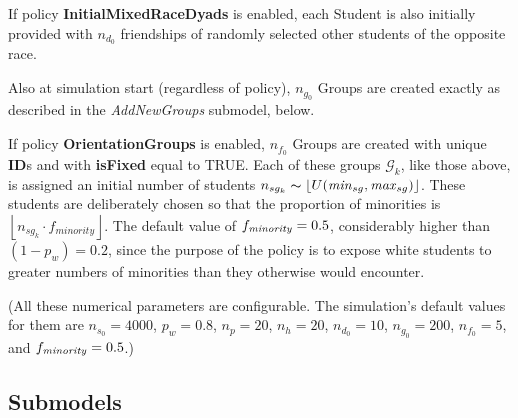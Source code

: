 If policy \textbf{InitialMixedRaceDyads} is enabled, each Student is also
initially provided with $n_{d_0}$ friendships of randomly selected other
students of the opposite race.

Also at simulation start (regardless of policy), $n_{g_0}$ Groups are created
exactly as described in the \textsl{AddNewGroups} submodel, below.

If policy \textbf{OrientationGroups} is enabled, $n_{f_0}$ Groups are
created with unique \textbf{ID}s and with \textbf{isFixed} equal to TRUE. Each
of these groups $\mathcal{G}_k$, like those above, is assigned an initial
number of students $n_{sg_k} \thicksim \left\lfloor
U(\text{\textit{min}}_{sg},\text{\textit{max}}_{sg}) \right\rfloor$. These
students are deliberately chosen so that the proportion of minorities is
$\left\lfloor n_{sg_k} \cdot f_{\textit{minority}} \right \rfloor$. The
default value of $f_{\text{\textit{minority}}}=0.5$, considerably higher than
$(1-p_w)=0.2$, since the purpose of the policy is to expose white students to
greater numbers of minorities than they otherwise would encounter.

(All these numerical parameters are configurable. The simulation's default
values for them are $n_{s_0}=4000$, $p_w=0.8$, $n_p=20$, $n_h=20$,
$n_{d_0}=10$, $n_{g_0}=200$, $n_{f_0}=5$, and
$f_{\text{\textit{minority}}}=0.5$.)

\subsection{Submodels}

